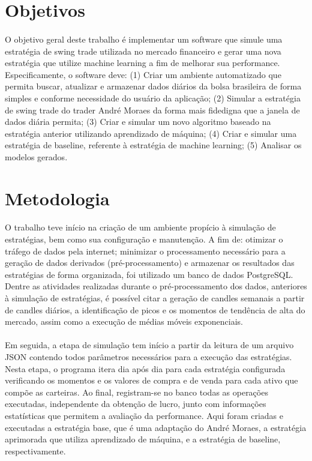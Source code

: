 \section{Objetivos}

\paragraph{} O objetivo geral deste trabalho é implementar um software que simule uma estratégia de swing trade utilizada no mercado financeiro e gerar uma nova estratégia que utilize machine learning a fim de melhorar sua performance. Especificamente, o software deve: (1) Criar um ambiente automatizado que permita buscar, atualizar e armazenar dados diários da bolsa brasileira de forma simples e conforme necessidade do usuário da aplicação; (2) Simular a estratégia de swing trade do trader André Moraes da forma mais fidedigna que a janela de dados diária permita; (3) Criar e simular um novo algoritmo baseado na estratégia anterior utilizando aprendizado de máquina; (4) Criar e simular uma estratégia de baseline, referente à estratégia de machine learning; (5) Analisar os modelos gerados.

\section{Metodologia}

\paragraph{} O trabalho teve início na criação de um ambiente propício à simulação de estratégias, bem como sua configuração e manutenção. A fim de: otimizar o tráfego de dados pela internet; minimizar o processamento necessário para a geração de dados derivados (pré-processamento) e armazenar os resultados das estratégias de forma organizada, foi utilizado um banco de dados PostgreSQL. Dentre as atividades realizadas durante o pré-processamento dos dados, anteriores à simulação de estratégias, é possível citar a geração de candles semanais a partir de candles diários, a identificação de picos e os momentos de tendência de alta do mercado, assim como a execução de médias móveis exponenciais.

\paragraph{} Em seguida, a etapa de simulação tem início a partir da leitura de um arquivo JSON contendo todos parâmetros necessários para a execução das estratégias. Nesta etapa, o programa itera dia após dia para cada estratégia configurada verificando os momentos e os valores de compra e de venda para cada ativo que compõe as carteiras. Ao final, registram-se no banco todas as operações executadas, independente da obtenção de lucro, junto com informações estatísticas que permitem a avaliação da performance. Aqui foram criadas e executadas a estratégia base, que é uma adaptação do André Moraes, a estratégia aprimorada que utiliza aprendizado de máquina, e a estratégia de baseline, respectivamente.

